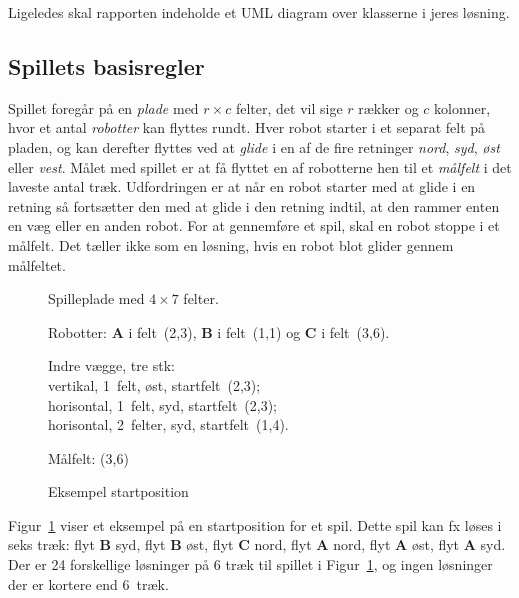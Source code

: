 Ligeledes skal rapporten indeholde et UML diagram over klasserne i
jeres løsning.

\subsection*{Spillets basisregler}
\label{sec:spillets-basisregler}

Spillet foregår på en \emph{plade} med $r \times c$ felter, det vil
sige $r$ rækker og $c$ kolonner, hvor et antal
\emph{robotter} kan flyttes rundt. Hver robot starter i et separat felt på
pladen, og kan derefter flyttes ved at \emph{glide} i en af de fire
retninger \emph{nord}, \emph{syd}, \emph{øst} eller \emph{vest}. Målet
med spillet er at få flyttet en af robotterne hen til et
\emph{målfelt} i det laveste antal træk. Udfordringen er at når en
robot starter med at glide i en retning så fortsætter den med at glide
i den retning indtil, at den rammer enten en væg eller en anden
robot. For at gennemføre et spil, skal en robot stoppe i et
målfelt. Det tæller ikke som en løsning, hvis en robot blot glider
gennem målfeltet.

\begin{figure}
\hfill
\begin{minipage}[t]{0.4\linewidth}
  \raggedright\setlength{\parskip}{1ex}
  Spilleplade med $4\times 7$ felter.

  Robotter: \textbf{A} i felt~(2,3), \textbf{B} i felt~(1,1) og
  \textbf{C} i felt~(3,6).

  Indre vægge, tre stk: \\
  vertikal, 1~felt, øst, startfelt~(2,3); \\
  horisontal, 1~felt, syd, startfelt~(2,3); \\
  horisontal, 2~felter, syd, startfelt~(1,4).

  Målfelt: (3,6)
\end{minipage}
  \caption{Eksempel startposition}
  \label{fig:example}
\end{figure}

Figur~\ref{fig:example} viser et eksempel på en startposition for et
spil. Dette spil kan fx løses i seks træk: flyt \textbf{B} syd, flyt
\textbf{B} øst, flyt \textbf{C} nord, flyt \textbf{A} nord, flyt
\textbf{A} øst, flyt \textbf{A} syd. Der er 24 forskellige løsninger
på 6 træk til spillet i Figur~\ref{fig:example}, og ingen løsninger der er
kortere end 6~træk.

